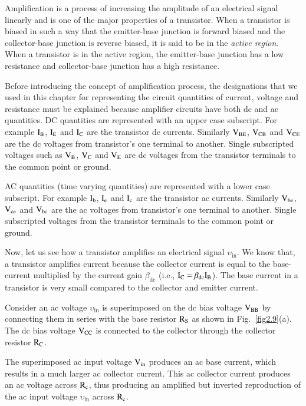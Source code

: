 Amplification is a process of increasing the amplitude of an electrical signal linearly and is one of the major properties of a transistor. When a transistor is biased in such a way that the emitter-base junction is forward biased and the collector-base junction is reverse biased, it is said to be in the {\em active region}. When a transistor is in the active region, the emitter-base junction has a low resistance and collector-base junction has a high resistance.

Before introducing the concept of amplification process, the designations that we used in this chapter for representing the circuit quantities of current, voltage and resistance must be explained because amplifier circuits have both dc and ac quantities. DC quantities are represented with an upper case subscript. For example $\textrm{I}_{\textrm{B}}$, $\textrm{I}_{\textrm{E}}$ and $\textrm{I}_{\textrm{C}}$ are the transistor dc currents. Similarly $\textrm{V}_{\text{BE}}$, $\textrm{V}_{\text{CB}}$ and $\textrm{V}_{\text{CE}}$ are the dc voltages from transistor's one terminal to another. Single subscripted voltages such as $\textrm{V}_{\textrm{B}}$, $\textrm{V}_{\textrm{C}}$ and $\textrm{V}_{\textrm{E}}$ are dc voltages from the transistor terminals to the common point or ground.

AC quantities (time varying quantities) are represented with a lower case subscript. For example $\textrm{I}_{\textrm{b}}$, $\textrm{I}_{\textrm{e}}$ and $\textrm{I}_{\textrm{c}}$ are the transistor ac currents. Similarly $\textrm{V}_{\text{be}}$, $\textrm{V}_{\text{ce}}$ and $\textrm{V}_{\text{bc}}$ are the ac voltages from transistor's one terminal to another. Single subscripted voltages from the transistor terminals to the common point or ground.

Now, let us see how a transistor amplifies an electrical signal $\upsilon_{\text{in}}$. We know that, a transistor amplifies current because the collector current is equal to the base-current multiplied by the current gain $\beta_{\text{dc}}$ (i.e., $\textrm{I}_{\textrm{C}}=\beta_{\text{dc}}\textrm{I}_{\textrm{B}}$). The base current in a transistor is very small compared to the collector and emitter current.

Consider an ac voltage $\upsilon_{\text{in}}$ is superimposed on the dc bias voltage $\textrm{V}_{\text{BB}}$ by connecting them in series with the base resistor $\textrm{R}_{\textrm{S}}$ as shown in Fig.~\ref{fig2.9}(a). The dc bias voltage $\textrm{V}_{\text{CC}}$ is connected to the collector through the collector resistor $\textrm{R}_{\textrm{C}}$.

The superimposed ac input voltage $\textrm{V}_{\text{in}}$ produces an ac base current, which results in a much larger ac collector current. This ac collector current produces an ac voltage across $\textrm{R}_{\textrm{c}}$, thus producing an amplified but inverted reproduction of the ac input voltage $\upsilon_{\text{in}}$ across $\textrm{R}_{\textrm{c}}$.

